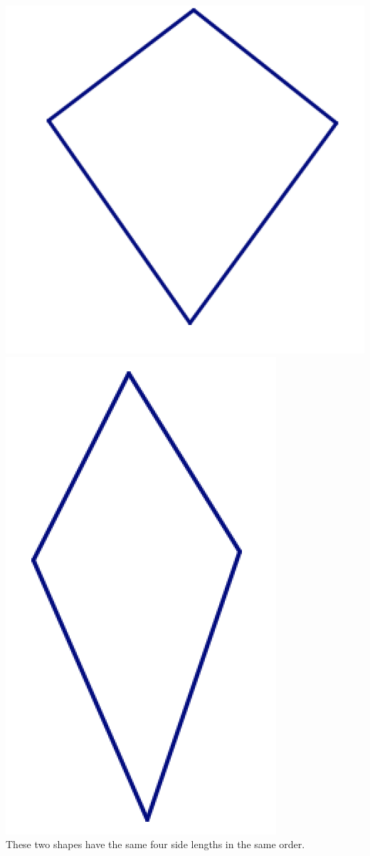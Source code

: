 \begin{center}
\includegraphics[scale = .45]{kite1}
\qquad\qquad
\includegraphics[scale = .45]{kite2}\\
 These two shapes have the same four side lengths in the same order.


\end{center}
